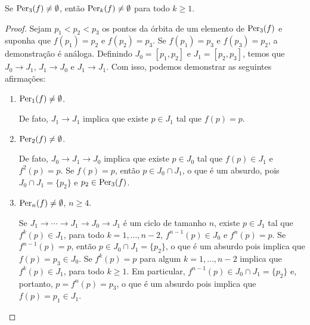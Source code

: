 \begin{theorem}
Se $\operatorname{Per}_3(f) \neq \emptyset$, então $\operatorname{Per}_k(f) \neq \emptyset$ para todo $k \geq 1$.
\end{theorem}

\begin{proof}
Sejam $p_1 < p_2 < p_3$ os pontos da órbita de um elemento de $\operatorname{Per}_3(f)$ e suponha que $f(p_1) = p_2$ e $f(p_2) = p_3$.
Se $f(p_1) = p_3$ e $f(p_3) = p_2$, a demonstração é análoga.
Definindo $J_0 = [p_1, p_2]$ e $J_1 = [p_2, p_3]$, temos que $J_0 \longrightarrow J_1$, $J_1 \longrightarrow J_0$ e $J_1 \longrightarrow J_1$. Com isso, podemos demonstrar as seguintes afirmações:

\begin{enumerate}[label=\alph*.]
\item $\operatorname{Per}_1(f) \neq \emptyset$.

De fato, $J_1 \longrightarrow J_1$ implica que existe $p \in J_1$ tal que $f(p) = p$.

\item $\operatorname{Per}_2(f) \neq \emptyset$.

De fato, $J_0 \longrightarrow J_1 \longrightarrow J_0$ implica que existe $p \in J_0$ tal que $f(p) \in J_1$ e $f^2(p) = p$. Se $f(p) = p$, então $p \in J_0 \cap J_1$, o que é um absurdo, pois $J_0 \cap J_1 = \{ p_2 \}$ e $p_2 \in \operatorname{Per}_3(f)$.

\item $\operatorname{Per}_n(f) \neq \emptyset$, $n \geq 4$.

Se $J_1 \longrightarrow \cdots \longrightarrow J_1 \longrightarrow J_0 \longrightarrow J_1$ é um ciclo de tamanho $n$, existe $p \in J_1$ tal que $f^k(p) \in J_1$, para todo $k = 1, \dots, n-2$, $f^{n-1}(p) \in J_0$ e $f^n(p) = p$. Se $f^{n-1}(p) = p$, então $p \in J_0 \cap J_1 = \{p_2\}$, o que é um absurdo pois implica que $f(p) = p_3 \in J_0$. Se $f^k(p) = p$ para algum $k = 1, \dots, n-2$ implica que $f^k(p) \in J_1$, para todo $k \geq 1$. Em particular, $f^{n-1}(p) \in J_0 \cap J_1 = \{p_2\}$ e, portanto, $p = f^n(p) = p_3$, o que é um absurdo pois implica que $f(p) = p_1 \in J_1$. 
\end{enumerate}







\end{proof}
